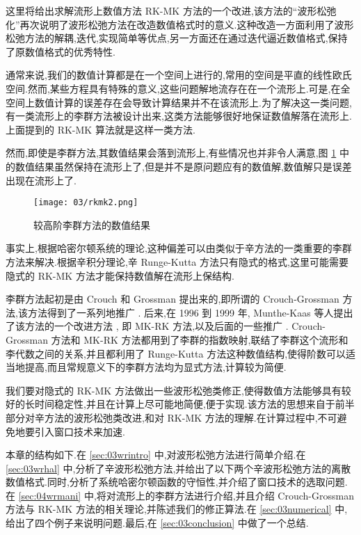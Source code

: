 这里将给出求解流形上数值方法 RK-MK \cite{arieh2005liegroup} 方法的一个改进,该方法的``波形松弛化''再次说明了波形松弛方法在改造数值格式时的意义.这种改造一方面利用了波形松弛方法的解耦,迭代,实现简单等优点,另一方面还在通过迭代逼近数值格式,保持了原数值格式的优秀特性.

通常来说,我们的数值计算都是在一个空间上进行的,常用的空间是平直的线性欧氏空间.然而,某些方程具有特殊的意义,这些问题解地流存在在一个流形上.可是,在全空间上数值计算的误差存在会导致计算结果并不在该流形上.为了解决这一类问题,有一类流形上的李群方法被设计出来,这类方法能够很好地保证数值解落在流形上.上面提到的 RK-MK 算法就是这样一类方法.

然而,即使是李群方法,其数值结果会落到流形上,有些情况也并非令人满意,图 \ref{fig:rkmk2} 中的数值结果虽然保持在流形上了,但是并不是原问题应有的数值解,数值解只是误差出现在流形上了.
\begin{figure}[h!]
  \centering
  \texttt{[image: 03/rkmk2.png]}
  \caption{较高阶李群方法的数值结果}
  \label{fig:rkmk2}
\end{figure}

事实上,根据哈密尔顿系统的理论,这种偏差可以由类似于辛方法的一类重要的李群方法来解决.根据辛积分理论,辛 Runge-Kutta 方法只有隐式的格式,这里可能需要隐式的 RK-MK 方法才能保持数值解在流形上保结构.

李群方法起初是由 Crouch 和 Grossman \cite{crouch1993numerical} 提出来的,即所谓的 Crouch-Grossman 方法,该方法得到了一系列地推广 \cite{faleinsen2001multi,zaletkin2010numerical,bulychev2001numerical,buono2003numerical,billo1992numerical}. 后来,在 1996 到 1999 年, Munthe-Kaas  等人提出了该方法的一个改进方法 \cite{mk1996lie,mk1997numerical,mk1998runge,mk1999high}, 即 MK-RK 方法,以及后面的一些推广 \cite{ostermann2010exponential,owren2000the,bruls2012lie,munthe2013onpost,garcla2011onalg}. Crouch-Grossman 方法和 MK-RK 方法都用到了李群的指数映射,联结了李群这个流形和李代数之间的关系,并且都利用了 Runge-Kutta 方法这种数值结构,使得阶数可以适当地提高,而且常规意义下的李群方法均为显式方法,计算较为简便.

我们要对隐式的 RK-MK 方法做出一些波形松弛类修正,使得数值方法能够具有较好的长时间稳定性,并且在计算上尽可能地简便,便于实现.该方法的思想来自于前半部分对辛方法的波形松弛类改进,和对 RK-MK 方法的理解.在计算过程中,不可避免地要引入窗口技术来加速.

本章的结构如下.在 \ref{sec:03wrintro} 中,对波形松弛方法进行简单介绍.在 \ref{sec:03wrhal} 中,分析了辛波形松弛方法,并给出了以下两个辛波形松弛方法的离散数值格式.同时,分析了系统哈密尔顿函数的守恒性,并介绍了窗口技术的选取问题.在 \ref{sec:04wrmani} 中,将对流形上的李群方法进行介绍,并且介绍 Crouch-Grossman 方法与 RK-MK 方法的相关理论,并陈述我们的修正算法.在 \ref{sec:03numerical} 中,给出了四个例子来说明问题.最后,在 \ref{sec:03conclusion} 中做了一个总结.


